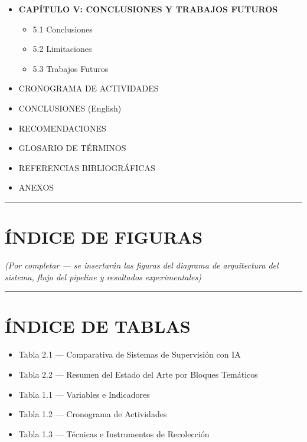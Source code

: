 \begin{itemize}
  \begin{itemize}
  \tightlist
  \item
    4.1 Resultados Cuantitativos
  \item
    4.2 Resultados Cualitativos
  \item
    4.3 Discusión de Resultados
  \end{itemize}
\item
  \textbf{CAPÍTULO V: CONCLUSIONES Y TRABAJOS FUTUROS}

  \begin{itemize}
  \tightlist
  \item
    5.1 Conclusiones
  \item
    5.2 Limitaciones
  \item
    5.3 Trabajos Futuros
  \end{itemize}
\item
  CRONOGRAMA DE ACTIVIDADES
\item
  CONCLUSIONES (English)
\item
  RECOMENDACIONES
\item
  GLOSARIO DE TÉRMINOS
\item
  REFERENCIAS BIBLIOGRÁFICAS
\item
  ANEXOS
\end{itemize}

\begin{center}\rule{0.5\linewidth}{0.5pt}\end{center}

\section{ÍNDICE DE FIGURAS}\label{uxedndice-de-figuras}

\emph{(Por completar --- se insertarán las figuras del diagrama de
arquitectura del sistema, flujo del pipeline y resultados
experimentales)}

\begin{center}\rule{0.5\linewidth}{0.5pt}\end{center}

\section{ÍNDICE DE TABLAS}\label{uxedndice-de-tablas}

\begin{itemize}
\tightlist
\item
  Tabla 2.1 --- Comparativa de Sistemas de Supervisión con IA
\item
  Tabla 2.2 --- Resumen del Estado del Arte por Bloques Temáticos
\item
  Tabla 1.1 --- Variables e Indicadores
\item
  Tabla 1.2 --- Cronograma de Actividades
\item
  Tabla 1.3 --- Técnicas e Instrumentos de Recolección
\end{itemize}

